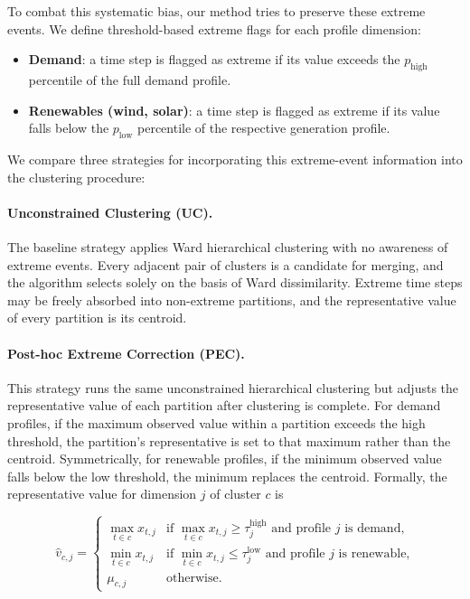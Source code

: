 To combat this systematic bias, our method tries to preserve these extreme events. We define threshold-based extreme flags for each profile dimension:

\begin{itemize}
    \item \textbf{Demand}: a time step is flagged as extreme if its value exceeds 
    the $p_{\text{high}}$ percentile of the full demand profile.
    \item \textbf{Renewables (wind, solar)}: a time step is flagged as extreme if 
    its value falls below the $p_{\text{low}}$ percentile of the respective 
    generation profile.
\end{itemize}

\noindent We compare three strategies for incorporating this extreme-event 
information into the clustering procedure:

\paragraph{Unconstrained Clustering (UC).}
The baseline strategy applies Ward hierarchical clustering with no awareness of extreme 
events. Every adjacent pair of clusters is a candidate for merging, and the 
algorithm selects solely on the basis of Ward dissimilarity. Extreme time steps 
may be freely absorbed into non-extreme partitions, and the representative value 
of every partition is its centroid.

\paragraph{Post-hoc Extreme Correction (PEC).}
This strategy runs the same unconstrained hierarchical clustering but adjusts the 
representative value of each partition after clustering is complete. For demand 
profiles, if the maximum observed value within a partition exceeds the high 
threshold, the partition's representative is set to that maximum rather than the 
centroid. Symmetrically, for renewable profiles, if the minimum observed value 
falls below the low threshold, the minimum replaces the centroid. Formally, the 
representative value for dimension $j$ of cluster $c$ is

\[
\hat{v}_{c,j} = \begin{cases}
\max_{t \in c} x_{t,j} & \text{if } \max_{t \in c} x_{t,j} \geq \tau^{\text{high}}_j 
                          \text{ and profile } j \text{ is demand,} \\
\min_{t \in c} x_{t,j} & \text{if } \min_{t \in c} x_{t,j} \leq \tau^{\text{low}}_j 
                          \text{ and profile } j \text{ is renewable,} \\
\mu_{c,j}              & \text{otherwise.}
\end{cases}
\]

